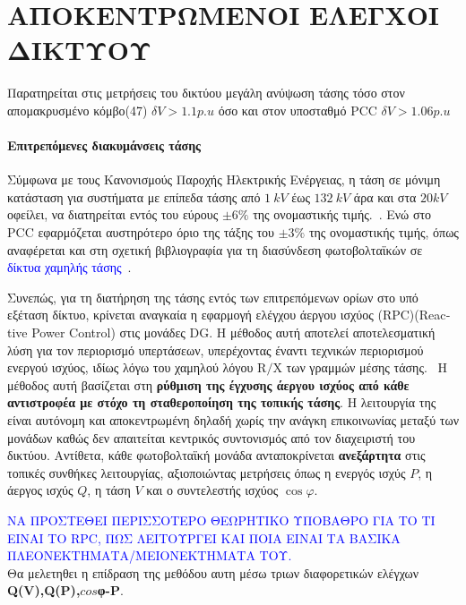 {\section{ΑΠΟΚΕΝΤΡΩΜΕΝΟΙ ΕΛΕΓΧΟΙ ΔΙΚΤΥΟΥ}
Παρατηρείται στις μετρήσεις του δικτύου μεγάλη ανύψωση τάσης τόσο στον απομακρυσμένο κόμβο(47) $δV>1.1 p.u$ όσο και στον  υποσταθμό  \textlatin{PCC} $δV>1.06 p.u$
\paragraph{Επιτρεπόμενες διακυμάνσεις τάσης}
Σύμφωνα με τους Κανονισμούς Παροχής Ηλεκτρικής Ενέργειας, η τάση σε μόνιμη κατάσταση για συστήματα με επίπεδα τάσης από $1~kV$  έως $132~kV$  άρα και στα $20kV$ οφείλει, να διατηρείται εντός του εύρους $\pm 6\%$ της ονομαστικής τιμής.~\cite{masters2002voltageRise}.
Ενώ στο \textlatin{PCC} εφαρμόζεται αυστηρότερο όριο της τάξης του $\pm 3\%$ της ονομαστικής τιμής, όπως αναφέρεται και στη σχετική βιβλιογραφία για τη διασύνδεση φωτοβολταϊκών σε \textcolor{blue}{δίκτυα χαμηλής τάσης}~\cite{stetz2012lowVoltagePV}.


Συνεπώς, για τη διατήρηση της τάσης εντός των επιτρεπόμενων ορίων στο υπό εξέταση δίκτυο, κρίνεται αναγκαία η εφαρμογή ελέγχου άεργου ισχύος (\textlatin{RPC})(\textlatin{Reactive Power Control}) στις μονάδες \textlatin{DG}. Η μέθοδος αυτή αποτελεί αποτελεσματική λύση για τον περιορισμό υπερτάσεων, υπερέχοντας έναντι τεχνικών περιορισμού ενεργού ισχύος, ιδίως λόγω του χαμηλού λόγου $\mathrm{R/X}$ των γραμμών μέσης τάσης.~\cite{kryonidis2017probabilisticVoltageControl}
Η μέθοδος αυτή βασίζεται στη \textbf{ρύθμιση της έγχυσης άεργου ισχύος από κάθε αντιστροφέα με στόχο τη σταθεροποίηση της τοπικής τάσης}. Η λειτουργία της είναι αυτόνομη και αποκεντρωμένη δηλαδή χωρίς την ανάγκη επικοινωνίας μεταξύ των μονάδων καθώς δεν απαιτείται κεντρικός συντονισμός από τον διαχειριστή του δικτύου. Αντίθετα, κάθε φωτοβολταϊκή μονάδα ανταποκρίνεται \textbf{ανεξάρτητα} στις τοπικές συνθήκες λειτουργίας, αξιοποιώντας μετρήσεις όπως η ενεργός ισχύς $P$, η άεργος ισχύς $Q$, η τάση $V$ και ο συντελεστής ισχύος $\cos\varphi$. 

\textcolor{blue}{ΝΑ ΠΡΟΣΤΕΘΕΙ ΠΕΡΙΣΣΟΤΕΡΟ ΘΕΩΡΗΤΙΚΟ ΥΠΟΒΑΘΡΟ ΓΙΑ ΤΟ ΤΙ ΕΙΝΑΙ ΤΟ \textlatin{RPC}, ΠΩΣ ΛΕΙΤΟΥΡΓΕΙ ΚΑΙ ΠΟΙΑ ΕΙΝΑΙ ΤΑ ΒΑΣΙΚΑ ΠΛΕΟΝΕΚΤΗΜΑΤΑ/ΜΕΙΟΝΕΚΤΗΜΑΤΑ ΤΟΥ.}\\
Θα μελετηθει η επίδραση της μεθόδου αυτη μέσω τριων διαφορετικών ελέγχων \textbf{\textlatin{Q(V),Q(P)},$cos$φ-\textlatin{P}}.\\

}
